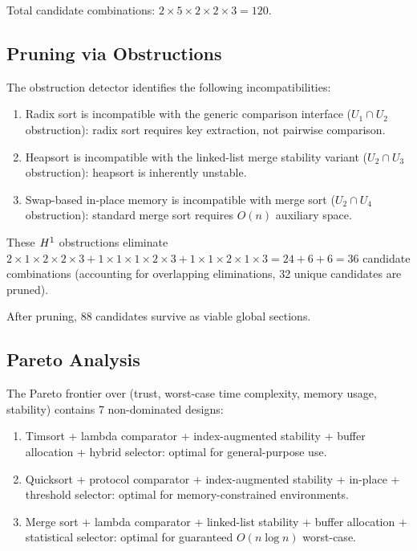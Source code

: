 \documentclass[11pt]{article}
\begin{document}
Total candidate combinations: $2 \times 5 \times 2 \times 2 \times 3 = 120$.

\subsection{Pruning via Obstructions}

The obstruction detector identifies the following incompatibilities:

\begin{enumerate}[noitemsep]
  \item Radix sort is incompatible with the generic comparison interface
        ($U_1 \cap U_2$ obstruction): radix sort requires key extraction,
        not pairwise comparison.
  \item Heapsort is incompatible with the linked-list merge stability
        variant ($U_2 \cap U_3$ obstruction): heapsort is inherently
        unstable.
  \item Swap-based in-place memory is incompatible with merge sort
        ($U_2 \cap U_4$ obstruction): standard merge sort requires
        $O(n)$ auxiliary space.
\end{enumerate}

These $H^{1}$ obstructions eliminate $2 \times 1 \times 2 \times 2
\times 3 + 1 \times 1 \times 1 \times 2 \times 3 + 1 \times 1 \times 2
\times 1 \times 3 = 24 + 6 + 6 = 36$ candidate combinations (accounting
for overlapping eliminations, 32 unique candidates are pruned).

After pruning, 88 candidates survive as viable global sections.

\subsection{Pareto Analysis}

The Pareto frontier over (trust, worst-case time complexity, memory
usage, stability) contains 7 non-dominated designs:

\begin{enumerate}[noitemsep]
  \item Timsort + lambda comparator + index-augmented stability +
        buffer allocation + hybrid selector: optimal for general-purpose
        use.
  \item Quicksort + protocol comparator + index-augmented stability +
        in-place + threshold selector: optimal for memory-constrained
        environments.
  \item Merge sort + lambda comparator + linked-list stability +
        buffer allocation + statistical selector: optimal for
        guaranteed $O(n \log n)$ worst-case.
\end{enumerate}
\end{document}

